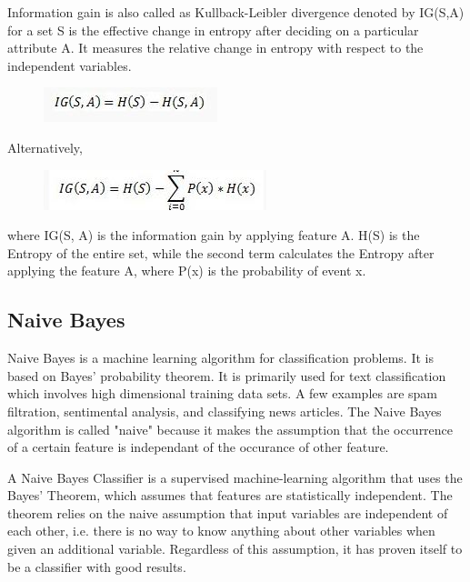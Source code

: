    Information gain is also called as Kullback-Leibler divergence denoted by IG(S,A) for a set S is the effective change in entropy after deciding on a particular attribute A. It measures the relative change in entropy with respect to the independent variables.
  
   
   \begin{figure}[h!]
        \centering
        \includegraphics[scale=0.8]{Figures/a2.png}
   \end{figure}
  
   Alternatively,
   
   \begin{figure}[h!]
       \centering
         \includegraphics[scale=0.8]{Figures/a3.png}
   \end{figure}
  
   where IG(S, A) is the information gain by applying feature A. H(S) is the Entropy of the entire set, while the second term calculates the Entropy after applying the feature A, where P(x) is the probability of event x.
  
\subsection{Naive Bayes}
  
  Naive Bayes is a machine learning algorithm for classification problems. It is based on Bayes’ probability theorem. It is primarily used for text classification which involves high dimensional training data sets. A few examples are spam filtration, sentimental analysis, and classifying news articles.
  The Naive Bayes algorithm is called "naive" because it makes the assumption that the occurrence of a certain feature is independant of the occurance of other feature. 
  
  A Naive Bayes Classifier is a supervised machine-learning algorithm that uses the Bayes’ Theorem, which assumes that features are statistically independent. The theorem relies on the naive assumption that input variables are independent of each other, i.e. there is no way to know anything about other variables when given an additional variable. Regardless of this assumption, it has proven itself to be a classifier with good results.
  

